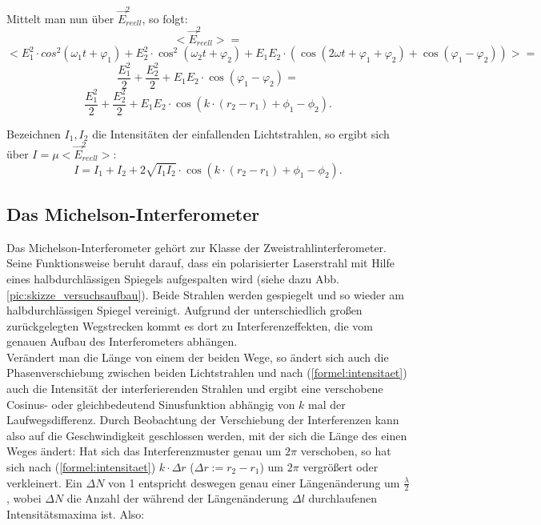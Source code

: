 Mittelt man nun über $  \vec{E}_{reell} ^{2} $, so folgt: 
\begin{equation}
\nonumber
<\vec{E}_{reell}^{2}> = 
\end{equation}
\begin{equation}
\nonumber
< E_{1}^{2} \cdot cos^{2}(\omega_{1}t + \varphi_{1}) + E_{2}^{2} \cdot \cos^{2}(\omega_{2}t + \varphi_{2}) + E_{1}E_{2} \cdot (\cos(2\omega t + \varphi_{1} + \varphi_{2}) + \cos(\varphi_{1} - \varphi_{2})) > = 
\end{equation}
\begin{equation}
\nonumber
\frac{E_{1}^{2}}{2} + \frac{E_{2}^{2}}{2} + E_{1}E_{2} \cdot \cos(\varphi_{1} - \varphi_{2}) = 
\end{equation}
\begin{equation}
\frac{E_{1}^{2}}{2} + \frac{E_{2}^{2}}{2} + E_{1}E_{2} \cdot \cos( k \cdot (r_{2} - r_{1}) + \phi_{1} - \phi_{2}).
\end{equation}

Bezeichnen $ I_{1}, I_{2} $ die Intensitäten der einfallenden Lichtstrahlen, so ergibt sich über $ I = \mu <\vec{E}_{reell}^{2}> $: 
\begin{equation}
\label{formel:intensitaet}
I = I_{1} + I_{2} + 2 \sqrt{I_{1} I_{2}} \cdot \cos( k \cdot (r_{2} - r_{1}) + \phi_{1} - \phi_{2}).
\end{equation}





\subsection{Das Michelson-Interferometer}

Das Michelson-Interferometer gehört zur Klasse der Zweistrahlinterferometer. Seine Funktionsweise beruht darauf, 
dass ein polarisierter Laserstrahl mit Hilfe eines halbdurchlässigen Spiegels aufgespalten wird (siehe dazu Abb.
\ref{pic:skizze_versuchsaufbau}). Beide Strahlen werden gespiegelt und so wieder am halbdurchlässigen Spiegel 
vereinigt. Aufgrund der unterschiedlich großen zurückgelegten Wegstrecken kommt es dort zu Interferenzeffekten,
die vom genauen Aufbau des Interferometers abhängen.\\
Verändert man die Länge von einem der beiden Wege, so ändert sich auch die Phasenverschiebung zwischen beiden 
Lichtstrahlen und nach (\ref{formel:intensitaet}) auch die Intensität der interferierenden Strahlen und ergibt eine verschobene 
Cosinus- oder gleichbedeutend Sinusfunktion abhängig von $ k $ mal der Laufwegsdifferenz. Durch Beobachtung der Verschiebung der Interferenzen kann also auf die Geschwindigkeit 
geschlossen werden, mit der sich die Länge des einen Weges ändert: 
Hat sich das Interferenzmuster genau um $ 2 \pi $ verschoben, so hat sich nach (\ref{formel:intensitaet}) $ k \cdot \Delta r $ ($ \Delta r := r_2 - r_1 $) um $ 2 \pi $ vergrößert oder verkleinert.
Ein $ \Delta N $ von 1 entspricht deswegen genau einer Längenänderung um $ \frac{\lambda}{2} $, wobei $ \Delta N $ die Anzahl der während der Längenänderung $ \Delta l $ durchlaufenen Intensitätsmaxima ist. Also:


